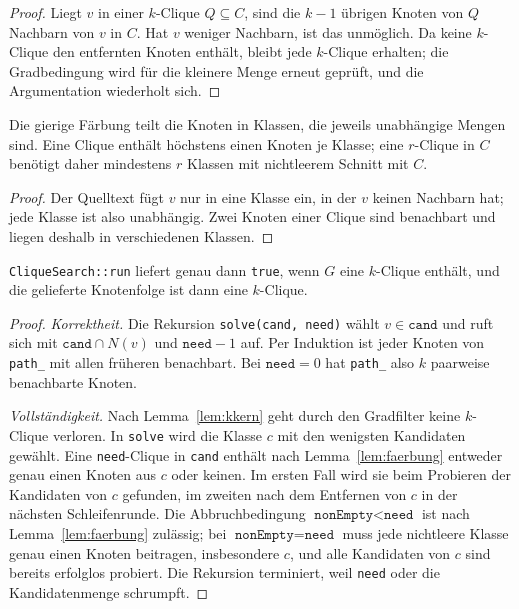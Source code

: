 \begin{proof}
	Liegt $v$ in einer $k$-Clique $Q\subseteq C$, sind die $k-1$ übrigen Knoten von $Q$ Nachbarn von $v$ in $C$. Hat $v$ weniger Nachbarn, ist das unmöglich. Da keine $k$-Clique den entfernten Knoten enthält, bleibt jede $k$-Clique erhalten; die Gradbedingung wird für die kleinere Menge erneut geprüft, und die Argumentation wiederholt sich.
\end{proof}

\begin{lemma}[Färbungsschranke]
	\label{lem:faerbung}
	Die gierige Färbung teilt die Knoten in Klassen, die jeweils unabhängige Mengen sind. Eine Clique enthält höchstens einen Knoten je Klasse; eine $r$-Clique in $C$ benötigt daher mindestens $r$ Klassen mit nichtleerem Schnitt mit $C$.
\end{lemma}

\begin{proof}
	Der Quelltext fügt $v$ nur in eine Klasse ein, in der $v$ keinen Nachbarn hat; jede Klasse ist also unabhängig. Zwei Knoten einer Clique sind benachbart und liegen deshalb in verschiedenen Klassen.
\end{proof}

\begin{satz}
	\label{satz:cliquensuche}
	\texttt{CliqueSearch::run} liefert genau dann \texttt{true}, wenn $G$ eine $k$-Clique enthält, und die gelieferte Knotenfolge ist dann eine $k$-Clique.
\end{satz}

\begin{proof}
	\emph{Korrektheit.} Die Rekursion \texttt{solve(cand, need)} wählt $v\in\texttt{cand}$ und ruft sich mit $\texttt{cand}\cap N(v)$ und $\texttt{need}-1$ auf. Per Induktion ist jeder Knoten von \texttt{path\_} mit allen früheren benachbart. Bei $\texttt{need}=0$ hat \texttt{path\_} also $k$ paarweise benachbarte Knoten.

	\emph{Vollständigkeit.} Nach Lemma~\ref{lem:kkern} geht durch den Gradfilter keine $k$-Clique verloren. In \texttt{solve} wird die Klasse $c$ mit den wenigsten Kandidaten gewählt. Eine \texttt{need}-Clique in \texttt{cand} enthält nach Lemma~\ref{lem:faerbung} entweder genau einen Knoten aus $c$ oder keinen. Im ersten Fall wird sie beim Probieren der Kandidaten von $c$ gefunden, im zweiten nach dem Entfernen von $c$ in der nächsten Schleifenrunde. Die Abbruchbedingung $\texttt{nonEmpty}<\texttt{need}$ ist nach Lemma~\ref{lem:faerbung} zulässig; bei $\texttt{nonEmpty}=\texttt{need}$ muss jede nichtleere Klasse genau einen Knoten beitragen, insbesondere $c$, und alle Kandidaten von $c$ sind bereits erfolglos probiert. Die Rekursion terminiert, weil \texttt{need} oder die Kandidatenmenge schrumpft.
\end{proof}

